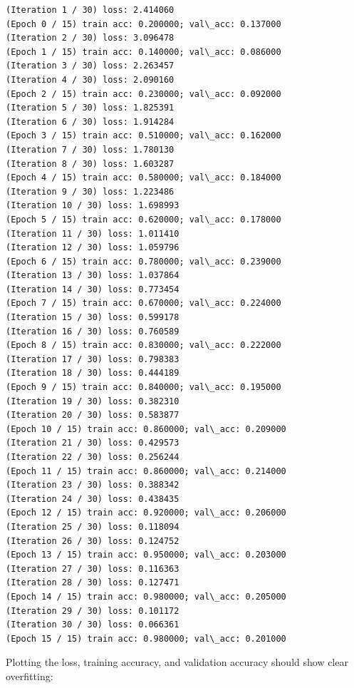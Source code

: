 \documentclass[11pt]{article}
\begin{document}
    \begin{Verbatim}[commandchars=\\\{\}]
(Iteration 1 / 30) loss: 2.414060
(Epoch 0 / 15) train acc: 0.200000; val\_acc: 0.137000
(Iteration 2 / 30) loss: 3.096478
(Epoch 1 / 15) train acc: 0.140000; val\_acc: 0.086000
(Iteration 3 / 30) loss: 2.263457
(Iteration 4 / 30) loss: 2.090160
(Epoch 2 / 15) train acc: 0.230000; val\_acc: 0.092000
(Iteration 5 / 30) loss: 1.825391
(Iteration 6 / 30) loss: 1.914284
(Epoch 3 / 15) train acc: 0.510000; val\_acc: 0.162000
(Iteration 7 / 30) loss: 1.780130
(Iteration 8 / 30) loss: 1.603287
(Epoch 4 / 15) train acc: 0.580000; val\_acc: 0.184000
(Iteration 9 / 30) loss: 1.223486
(Iteration 10 / 30) loss: 1.698993
(Epoch 5 / 15) train acc: 0.620000; val\_acc: 0.178000
(Iteration 11 / 30) loss: 1.011410
(Iteration 12 / 30) loss: 1.059796
(Epoch 6 / 15) train acc: 0.780000; val\_acc: 0.239000
(Iteration 13 / 30) loss: 1.037864
(Iteration 14 / 30) loss: 0.773454
(Epoch 7 / 15) train acc: 0.670000; val\_acc: 0.224000
(Iteration 15 / 30) loss: 0.599178
(Iteration 16 / 30) loss: 0.760589
(Epoch 8 / 15) train acc: 0.830000; val\_acc: 0.222000
(Iteration 17 / 30) loss: 0.798383
(Iteration 18 / 30) loss: 0.444189
(Epoch 9 / 15) train acc: 0.840000; val\_acc: 0.195000
(Iteration 19 / 30) loss: 0.382310
(Iteration 20 / 30) loss: 0.583877
(Epoch 10 / 15) train acc: 0.860000; val\_acc: 0.209000
(Iteration 21 / 30) loss: 0.429573
(Iteration 22 / 30) loss: 0.256244
(Epoch 11 / 15) train acc: 0.860000; val\_acc: 0.214000
(Iteration 23 / 30) loss: 0.388342
(Iteration 24 / 30) loss: 0.438435
(Epoch 12 / 15) train acc: 0.920000; val\_acc: 0.206000
(Iteration 25 / 30) loss: 0.118094
(Iteration 26 / 30) loss: 0.124752
(Epoch 13 / 15) train acc: 0.950000; val\_acc: 0.203000
(Iteration 27 / 30) loss: 0.116363
(Iteration 28 / 30) loss: 0.127471
(Epoch 14 / 15) train acc: 0.980000; val\_acc: 0.205000
(Iteration 29 / 30) loss: 0.101172
(Iteration 30 / 30) loss: 0.066361
(Epoch 15 / 15) train acc: 0.980000; val\_acc: 0.201000

    \end{Verbatim}

    Plotting the loss, training accuracy, and validation accuracy should
show clear overfitting:
\end{document}
